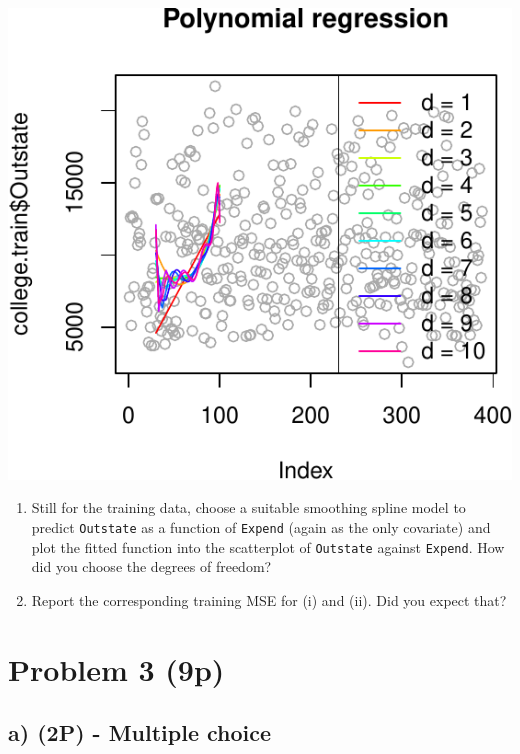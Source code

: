 \documentclass[]{article}
\providecommand{\tightlist}{%
  \setlength{\itemsep}{0pt}\setlength{\parskip}{0pt}}
\begin{document}
\begin{center}\includegraphics{Compulsory2_Group37_StatLearn_files/figure-latex/unnamed-chunk-16-1} \end{center}

\begin{enumerate}
\def\labelenumi{(\roman{enumi})}
\setcounter{enumi}{1}
\tightlist
\item
  Still for the training data, choose a suitable smoothing spline model
  to predict \texttt{Outstate} as a function of \texttt{Expend} (again
  as the only covariate) and plot the fitted function into the
  scatterplot of \texttt{Outstate} against \texttt{Expend}. How did you
  choose the degrees of freedom?
\item
  Report the corresponding training MSE for (i) and (ii). Did you expect
  that?
\end{enumerate}

\hypertarget{problem-3-9p}{%
\section{Problem 3 (9p)}\label{problem-3-9p}}

\hypertarget{a-2p---multiple-choice-1}{%
\subsection{a) (2P) - Multiple choice}\label{a-2p---multiple-choice-1}}
\end{document}
